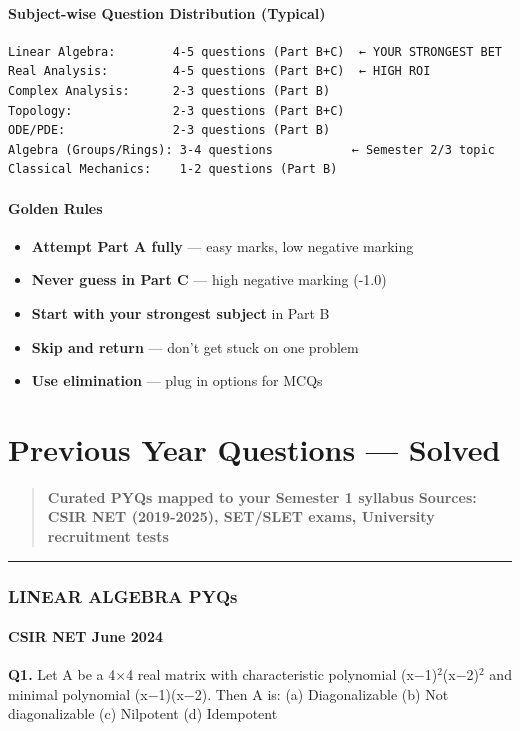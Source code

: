 \documentclass[12pt,a4paper,openany]{book}
\begin{document}
{{\subsubsection{Subject-wise Question Distribution (Typical)}
\begin{verbatim}
Linear Algebra:        4-5 questions (Part B+C)  ← YOUR STRONGEST BET
Real Analysis:         4-5 questions (Part B+C)  ← HIGH ROI
Complex Analysis:      2-3 questions (Part B)
Topology:              2-3 questions (Part B+C)
ODE/PDE:               2-3 questions (Part B)
Algebra (Groups/Rings): 3-4 questions           ← Semester 2/3 topic
Classical Mechanics:    1-2 questions (Part B)
\end{verbatim}

\subsubsection{Golden Rules}
\begin{itemize}
  \item \textbf{Attempt Part A fully} — easy marks, low negative marking
  \item \textbf{Never guess in Part C} — high negative marking (-1.0)
  \item \textbf{Start with your strongest subject} in Part B
  \item \textbf{Skip and return} — don't get stuck on one problem
  \item \textbf{Use elimination} — plug in options for MCQs
\end{itemize}

\newpage

\chapter{Previous Year Questions --- Solved}


\begin{quote}
\textbf{Curated PYQs mapped to your Semester 1 syllabus}
\textbf{Sources: CSIR NET (2019-2025), SET/SLET exams, University recruitment tests}
\end{quote}

\bigskip\noindent\rule{\textwidth}{0.4pt}\bigskip

\subsection{ LINEAR ALGEBRA PYQs}

\subsubsection{CSIR NET June 2024}
\textbf{Q1.} Let A be a 4$\times$4 real matrix with characteristic polynomial (x−1)$^2$(x−2)$^2$ and minimal polynomial (x−1)(x−2). Then A is:
(a) Diagonalizable  (b) Not diagonalizable  (c) Nilpotent  (d) Idempotent

}}
\end{document}
